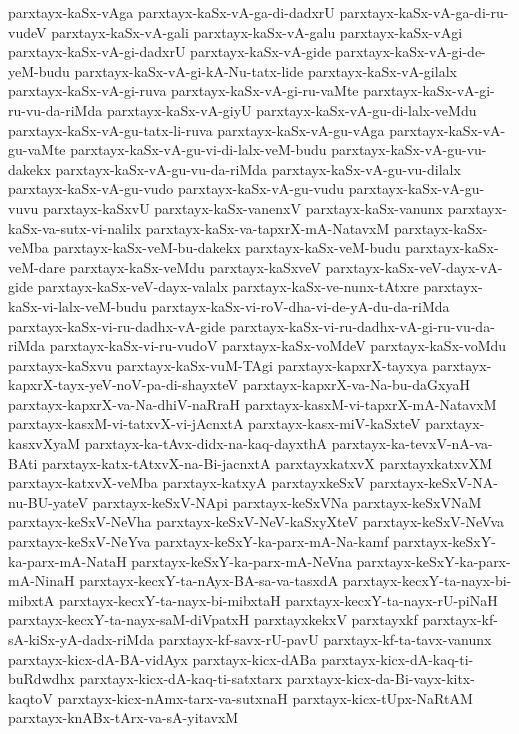 {parxtayx-kaSx-vAga
parxtayx-kaSx-vA-ga-di-dadxrU
parxtayx-kaSx-vA-ga-di-ru-vudeV
parxtayx-kaSx-vA-gali
parxtayx-kaSx-vA-galu
parxtayx-kaSx-vAgi
parxtayx-kaSx-vA-gi-dadxrU
parxtayx-kaSx-vA-gide
parxtayx-kaSx-vA-gi-de-yeM-budu
parxtayx-kaSx-vA-gi-kA-Nu-tatx-lide
parxtayx-kaSx-vA-gilalx
parxtayx-kaSx-vA-gi-ruva
parxtayx-kaSx-vA-gi-ru-vaMte
parxtayx-kaSx-vA-gi-ru-vu-da-riMda
parxtayx-kaSx-vA-giyU
parxtayx-kaSx-vA-gu-di-lalx-veMdu
parxtayx-kaSx-vA-gu-tatx-li-ruva
parxtayx-kaSx-vA-gu-vAga
parxtayx-kaSx-vA-gu-vaMte
parxtayx-kaSx-vA-gu-vi-di-lalx-veM-budu
parxtayx-kaSx-vA-gu-vu-dakekx
parxtayx-kaSx-vA-gu-vu-da-riMda
parxtayx-kaSx-vA-gu-vu-dilalx
parxtayx-kaSx-vA-gu-vudo
parxtayx-kaSx-vA-gu-vudu
parxtayx-kaSx-vA-gu-vuvu
parxtayx-kaSxvU
parxtayx-kaSx-vanenxV
parxtayx-kaSx-vanunx
parxtayx-kaSx-va-sutx-vi-nalilx
parxtayx-kaSx-va-tapxrX-mA-NatavxM
parxtayx-kaSx-veMba
parxtayx-kaSx-veM-bu-dakekx
parxtayx-kaSx-veM-budu
parxtayx-kaSx-veM-dare
parxtayx-kaSx-veMdu
parxtayx-kaSxveV
parxtayx-kaSx-veV-dayx-vA-gide
parxtayx-kaSx-veV-dayx-valalx
parxtayx-kaSx-ve-nunx-tAtxre
parxtayx-kaSx-vi-lalx-veM-budu
parxtayx-kaSx-vi-roV-dha-vi-de-yA-du-da-riMda
parxtayx-kaSx-vi-ru-dadhx-vA-gide
parxtayx-kaSx-vi-ru-dadhx-vA-gi-ru-vu-da-riMda
parxtayx-kaSx-vi-ru-vudoV
parxtayx-kaSx-voMdeV
parxtayx-kaSx-voMdu
parxtayx-kaSxvu
parxtayx-kaSx-vuM-TAgi
parxtayx-kapxrX-tayxya
parxtayx-kapxrX-tayx-yeV-noV-pa-di-shayxteV
parxtayx-kapxrX-va-Na-bu-daGxyaH
parxtayx-kapxrX-va-Na-dhiV-naRraH
parxtayx-kasxM-vi-tapxrX-mA-NatavxM
parxtayx-kasxM-vi-tatxvX-vi-jAcnxtA
parxtayx-kasx-miV-kaSxteV
parxtayx-kasxvXyaM
parxtayx-ka-tAvx-didx-na-kaq-dayxthA
parxtayx-ka-tevxV-nA-va-BAti
parxtayx-katx-tAtxvX-na-Bi-jacnxtA
parxtayxkatxvX
parxtayxkatxvXM
parxtayx-katxvX-veMba
parxtayx-katxyA
parxtayxkeSxV
parxtayx-keSxV-NA-nu-BU-yateV
parxtayx-keSxV-NApi
parxtayx-keSxVNa
parxtayx-keSxVNaM
parxtayx-keSxV-NeVha
parxtayx-keSxV-NeV-kaSxyXteV
parxtayx-keSxV-NeVva
parxtayx-keSxV-NeYva
parxtayx-keSxY-ka-parx-mA-Na-kamf
parxtayx-keSxY-ka-parx-mA-NataH
parxtayx-keSxY-ka-parx-mA-NeVna
parxtayx-keSxY-ka-parx-mA-NinaH
parxtayx-kecxY-ta-nAyx-BA-sa-va-tasxdA
parxtayx-kecxY-ta-nayx-bi-mibxtA
parxtayx-kecxY-ta-nayx-bi-mibxtaH
parxtayx-kecxY-ta-nayx-rU-piNaH
parxtayx-kecxY-ta-nayx-saM-diVpatxH
parxtayxkekxV
parxtayxkf
parxtayx-kf-sA-kiSx-yA-dadx-riMda
parxtayx-kf-savx-rU-pavU
parxtayx-kf-ta-tavx-vanunx
parxtayx-kicx-dA-BA-vidAyx
parxtayx-kicx-dABa
parxtayx-kicx-dA-kaq-ti-buRdwdhx
parxtayx-kicx-dA-kaq-ti-satxtarx
parxtayx-kicx-da-Bi-vayx-kitx-kaqtoV
parxtayx-kicx-nAmx-tarx-va-sutxnaH
parxtayx-kicx-tUpx-NaRtAM
parxtayx-knABx-tArx-va-sA-yitavxM
}
